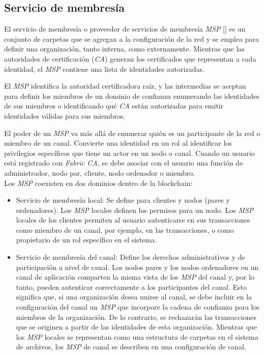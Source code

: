 \subsection{Servicio de membres\'ia}
El servicio de membres\'ia o proveedor de servicios de membres\'ia \emph{MSP} [\cite{MSP}] es un conjunto de carpetas que se agregan a la configuraci\'on de la red y se emplea para definir una organizaci\'on, tanto interna, como externamente. Mientras que las autoridades de certificaci\'on (\emph{CA}) generan los certificados que representan a cada identidad, el \emph{MSP} contiene una lista de identidades autorizadas.

El \emph{MSP} identifica la autoridad certificadora ra\'iz, y las intermedias se aceptan para definir los miembros de un dominio de confianza enumerando las identidades de sus miembros o identificando qu\'e \emph{CA} est\'an autorizadas para emitir identidades v\'alidas para sus miembros.

El poder de un \emph{MSP} va m\'as all\'a de enumerar qui\'en es un participante de la red o miembro de un canal. Convierte una identidad en un rol al identificar los privilegios espec\'ificos que tiene un actor en un nodo o canal. Cuando un usuario est\'a registrado con \emph{Fabric CA}, se debe asociar con el usuario una funci\'on de administrador, nodo par, cliente, nodo ordenador o miembro.\\ 


Los \emph{MSP} coexisten en dos dominios dentro de la blockchain:
\begin{itemize}
\item Servicio de membres\'ia local: Se define para clientes y nodos (pares y ordenadores). Los \emph{MSP} locales definen los permisos para un nodo. Los \emph{MSP} locales de los clientes permiten al usuario autenticarse en sus transacciones como miembro de un canal, por ejemplo, en las transacciones, o como propietario de un rol espec\'ifico en el sistema.

\item Servicio de membres\'ia del canal: Define los derechos administrativos y de participaci\'on a nivel de canal. Los nodos pares y los nodos ordenadores en un canal de aplicaci\'on comparten la misma vista de los \emph{MSP} del canal y, por lo tanto, pueden autenticar correctamente a los participantes del canal. Esto significa que, si una organizaci\'on desea unirse al canal, se debe incluir en la configuraci\'on del canal un \emph{MSP} que incorpore la cadena de confianza para los miembros de la organizaci\'on. De lo contrario, se rechazar\'an las transacciones que se originen a partir de las identidades de esta organizaci\'on. Mientras que los \emph{MSP} locales se representan como una estructura de carpetas en el sistema de archivos, los \emph{MSP} de canal se describen en una configuraci\'on de canal.
\end{itemize}

